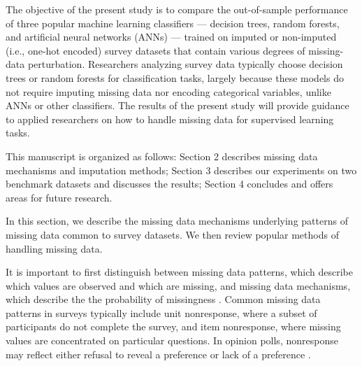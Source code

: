 \documentclass[10pt]{book}
\theoremstyle{definition}
\begin{document}
The objective of the present study is to compare the out-of-sample performance of three popular machine learning classifiers --- decision trees, random forests, and artificial neural networks (ANNs) --- trained on imputed or non-imputed (i.e., one-hot encoded) survey datasets that contain various degrees of missing-data perturbation. Researchers analyzing survey data typically choose decision trees or random forests for classification tasks, largely because these models do not require imputing missing data nor encoding categorical variables, unlike ANNs or other classifiers. The results of the present study will provide guidance to applied researchers on how to handle missing data for supervised learning tasks. 

This manuscript is organized as follows: Section 2 describes missing data mechanisms and imputation methods; Section 3 describes our experiments on two benchmark datasets and discusses the results; Section 4 concludes and offers areas for future research. 

\par

\lhead[\footnotesize\thepage\fancyplain{}\leftmark]{}\rhead[]{\fancyplain{}\rightmark\footnotesize\thepage}%

\setcounter{chapter}{2}
\setcounter{equation}{0} %

In this section, we describe the missing data mechanisms underlying patterns of missing data common to survey datasets. We then review popular methods of handling missing data.

\par
{}

It is important to first distinguish between missing data patterns, which describe which values are observed and which are missing, and missing data mechanisms, which describe the the probability of missingness  \citep[Chap.~1]{little2014}. Common missing data patterns in surveys typically include unit nonresponse, where a subset of participants do not complete the survey, and item nonresponse, where missing values are concentrated on particular questions. In opinion polls, nonresponse may reflect either refusal to reveal a preference or lack of a preference \citep{de2003prevention}. 
\end{document}
